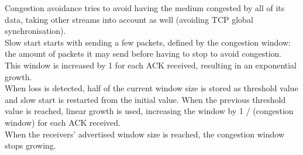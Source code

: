 Congestion avoidance tries to avoid having the medium congested by all of its data, taking other streams into account as well (avoiding TCP global synchronisation).\\
Slow start starts with sending a few packets, defined by the congestion window: the amount of packets it may send before having to stop to avoid congestion. This window is increased by 1 for each ACK received, resulting in an exponential growth.\\ When loss is detected, half of the current window size is stored as threshold value and slow start is restarted from the initial value. When the previous threshold value is reached, linear growth is used, increasing the window by 1 / (congestion window) for each ACK received. \\
When the receivers' advertised window size is reached, the congestion window stops growing.